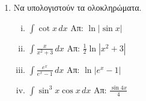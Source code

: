 \begin{enumerate}
\item Να υπολογιστούν τα ολοκληρώματα.

\begin{enumerate}[i)]
\item $\int \cot x \, dx$ \hfill Απ: $\ln|\sin x|$
\item $\int\frac{x}{x^2+3} \, dx$ \hfill Απ: $\frac{1}{2}\ln|x^2+3|$
\item $\int \frac{e^x}{e^x-1} \, dx$ \hfill Απ: $\ln|e^x-1|$
\item $\int \sin^3x\cos x \, dx$ \hfill Απ: $\frac{\sin4x}{4}$
\end{enumerate}



\end{enumerate}








